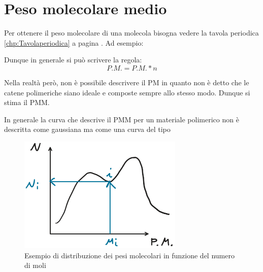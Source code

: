 \chapter{Peso molecolare medio}\label{ch:PM}
Per ottenere il peso molecolare di una molecola bisogna vedere la tavola periodica \ref{chp:Tavolaperiodica} a pagina \pageref{chp:Tavolaperiodica}.
Ad esempio:

\begin{figure}
\quad
{}
\end{figure}

Dunque in generale si può scrivere la regola:
\begin{equation}
P.M. = P.M. * n
\label{eqn:PM}
\end{equation}

Nella realtà però, non è possibile descrivere il \ac{PM} in quanto non è detto che le catene polimeriche siano ideale e composte sempre allo stesso modo.
Dunque si stima il \ac{PMM}.

In generale la curva che descrive il \ac{PMM} per un materiale polimerico non è descritta come gaussiana ma come una curva del tipo

\begin{figure}
\centering
\includegraphics[width = 0.7\textwidth]{gfx/PM}
\caption{Esempio di distribuzione dei pesi molecolari in funzione del numero di moli}
\label{fig:PM}
\end{figure}

